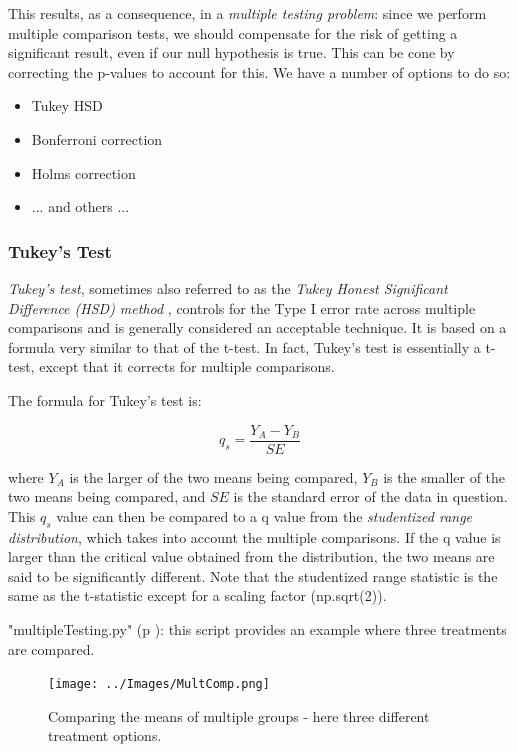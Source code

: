 This results, as a consequence, in a \emph{multiple testing problem}:
since we perform multiple comparison tests, we should compensate for the risk of getting a significant result, even if our null hypothesis is true. This can be cone by correcting the p-values to account for this. We have a number of options to do so:

\begin{itemize}
  \item Tukey HSD
  \item Bonferroni correction
  \item Holms correction
  \item ... and others ...
\end{itemize}


\subsubsection{Tukey's Test}

\emph{Tukey's test}, sometimes also referred to as the \emph{Tukey Honest Significant Difference (HSD) method }, controls for the Type I error rate across multiple comparisons and is generally considered an acceptable technique. It is based on a formula very similar to that of the t-test. In fact, Tukey's test is essentially a t-test, except that it corrects for multiple comparisons.

The formula for Tukey's test is:

\begin{equation}
    q_s = \frac{Y_A - Y_B}{SE}
\end{equation}

where $Y_A$ is the larger of the two means being compared, $Y_B$ is the smaller of the two means being compared, and $SE$ is the standard error of the data in question. This $q_s$ value can then be compared to a q value from the \emph{studentized range distribution}, which takes into account the multiple comparisons. If the q value is larger than the critical value obtained from the distribution, the two means are said to be significantly different.
Note that the studentized range statistic is the same as the t-statistic except for a scaling factor (np.sqrt(2)).

\PyImg "multipleTesting.py" (p \pageref{py:multipleTesting}): this script provides an example where three treatments are compared.

\begin{figure}
  \centering
  \texttt{[image: ../Images/MultComp.png]}\\
  \caption{Comparing the means of multiple groups - here three different treatment options.}
\end{figure}

